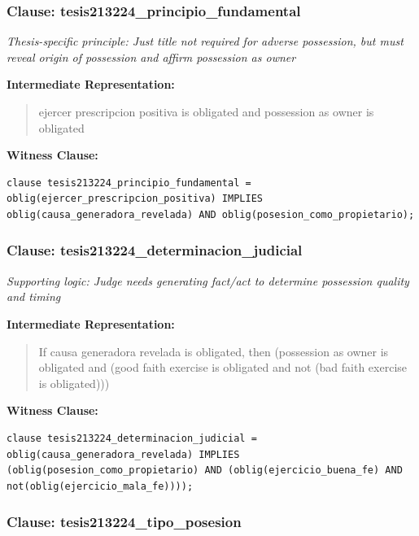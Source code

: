 \documentclass[11pt,a4paper]{article}
\begin{document}
\subsubsection{Clause: tesis213224\_principio\_fundamental}

\textit{Thesis-specific principle: Just title not required for adverse possession, but must reveal origin of possession and affirm possession as owner}

\textbf{Intermediate Representation:}

\begin{quote}
ejercer prescripcion positiva is obligated and possession as owner is obligated
\end{quote}

\textbf{Witness Clause:}

\begin{lstlisting}[style=witnessstyle, language=Witness]
clause tesis213224_principio_fundamental = oblig(ejercer_prescripcion_positiva) IMPLIES oblig(causa_generadora_revelada) AND oblig(posesion_como_propietario);
\end{lstlisting}

\subsubsection{Clause: tesis213224\_determinacion\_judicial}

\textit{Supporting logic: Judge needs generating fact/act to determine possession quality and timing}

\textbf{Intermediate Representation:}

\begin{quote}
If causa generadora revelada is obligated, then (possession as owner is obligated and (good faith exercise is obligated and not (bad faith exercise is obligated)))
\end{quote}

\textbf{Witness Clause:}

\begin{lstlisting}[style=witnessstyle, language=Witness]
clause tesis213224_determinacion_judicial = oblig(causa_generadora_revelada) IMPLIES (oblig(posesion_como_propietario) AND (oblig(ejercicio_buena_fe) AND not(oblig(ejercicio_mala_fe))));
\end{lstlisting}

\subsubsection{Clause: tesis213224\_tipo\_posesion}
\end{document}
